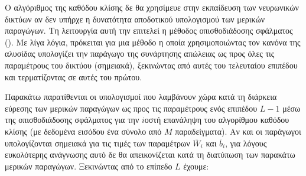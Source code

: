 Ο αλγόριθμος της καθόδου κλίσης δε θα χρησίμευε στην εκπαίδευση των νευρωνικών δικτύων αν δεν υπήρχε η δυνατότητα αποδοτικού υπολογισμού των μερικών παραγώγων. Τη λειτουργία αυτή την επιτελεί η μέθοδος οπισθοδιάδοσης σφάλματος (). Με λίγα λόγια, πρόκειται για μια μέθοδο η οποία χρησιμοποιώντας τον κανόνα της αλυσίδας υπολογίζει την παράγωγο της συνάρτησης απώλειας ως προς όλες τις παραμέτρους του δικτύου (σημειακά), ξεκινώντας από αυτές του τελευταίου επιπέδου και τερματίζοντας σε αυτές του πρώτου.\par

Παρακάτω παρατίθενται οι υπολογισμοί που λαμβάνουν χώρα κατά τη διάρκεια εύρεσης των μερικών παραγώγων ως προς τις παραμέτρους ενός επιπέδου $L-1$ μέσω της οπισθοδιάδοσης σφάλματος για την $i$\textendash οστή επανάληψη του αλγορίθμου καθόδου κλίσης (με δεδομένα εισόδου ένα σύνολο από $M$ παραδείγματα). Αν και οι παράγωγοι υπολογίζονται σημειακά για τις τιμές των παραμέτρων $\overline{W}_i$ και $\overline{b}_i$, για λόγους ευκολότερης ανάγνωσης αυτό δε θα απεικονίζεται κατά τη διατύπωση των παρακάτω μερικών παραγώγων. Ξεκινώντας από το επίπεδο $L$ έχουμε:
